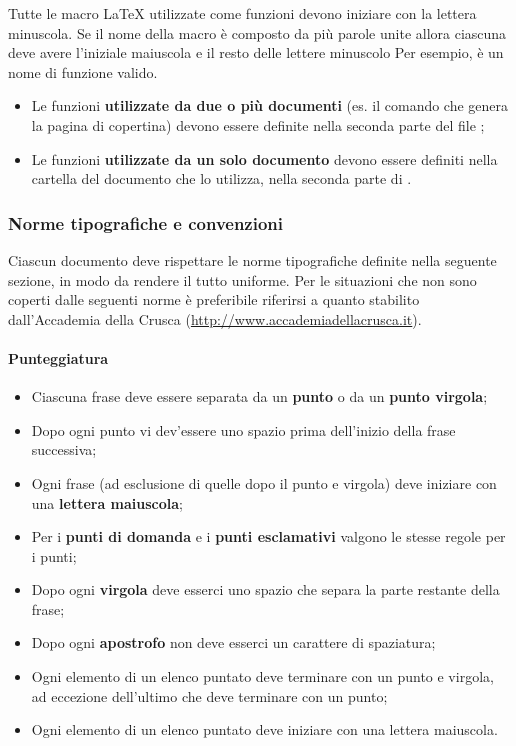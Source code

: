 Tutte le macro \LaTeX{} utilizzate come funzioni devono iniziare con la lettera minuscola. Se il nome della macro è composto da più parole unite allora ciascuna deve avere l'iniziale maiuscola e il resto delle lettere minuscolo Per esempio,  è un nome di funzione valido.

\begin{itemize}
	\item Le funzioni \textbf{utilizzate da due o più documenti} (es. il comando che genera la pagina di copertina) devono essere definite nella seconda parte del file ;
	
	\item Le funzioni \textbf{utilizzate da un solo documento} devono essere definiti nella cartella del documento che lo utilizza, nella seconda parte di .
\end{itemize}

\subsubsection{Norme tipografiche e convenzioni}

Ciascun documento deve rispettare le norme tipografiche definite nella seguente sezione, in modo da rendere il tutto uniforme. Per le situazioni che non sono coperti dalle seguenti norme è preferibile riferirsi a quanto stabilito dall'Accademia della Crusca (\url{http://www.accademiadellacrusca.it}).

	\paragraph{Punteggiatura}
	
	\begin{itemize}

		\item Ciascuna frase deve essere separata da un \textbf{punto} o da un \textbf{punto virgola};
		\item Dopo ogni punto vi dev'essere uno spazio prima dell'inizio della frase successiva;
		\item Ogni frase (ad esclusione di quelle dopo il punto e virgola) deve iniziare con una \textbf{lettera maiuscola};
		\item Per i \textbf{punti di domanda} e i \textbf{punti esclamativi} valgono le stesse regole per i punti;
		\item Dopo ogni \textbf{virgola} deve esserci uno spazio che separa la parte restante della frase;
		\item Dopo ogni \textbf{apostrofo} non deve esserci un carattere di spaziatura;
		\item Ogni elemento di un elenco puntato deve terminare con un punto e virgola, ad eccezione dell'ultimo che deve terminare con un punto;
		\item Ogni elemento di un elenco puntato deve iniziare con una lettera maiuscola.
	
	\end{itemize}
	
